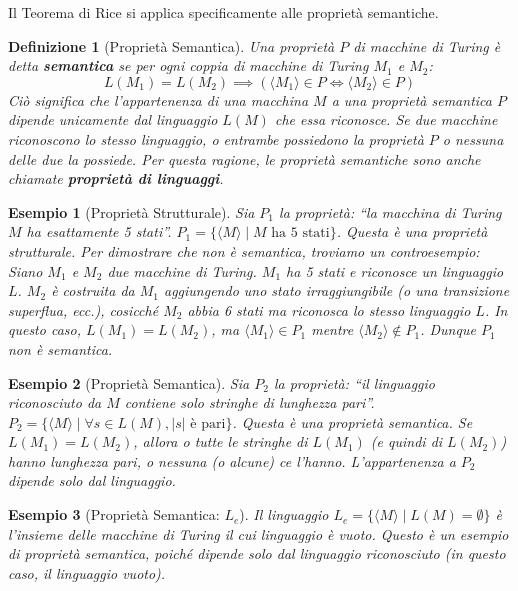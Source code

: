 \documentclass[a4paper]{article}
\newtheorem{definition}{Definizione}
\newtheorem{example}{Esempio}
\begin{document}
Il Teorema di Rice si applica specificamente alle proprietà semantiche.

\begin{definition}[Proprietà Semantica]
Una proprietà $P$ di macchine di Turing è detta \textbf{semantica} se per ogni coppia di macchine di Turing $M_1$ e $M_2$:
\[ L(M_1) = L(M_2) \implies (\langle M_1 \rangle \in P \iff \langle M_2 \rangle \in P) \]
Ciò significa che l'appartenenza di una macchina $M$ a una proprietà semantica $P$ dipende unicamente dal linguaggio $L(M)$ che essa riconosce. Se due macchine riconoscono lo stesso linguaggio, o entrambe possiedono la proprietà $P$ o nessuna delle due la possiede. Per questa ragione, le proprietà semantiche sono anche chiamate \textbf{proprietà di linguaggi}.
\end{definition}

\begin{example}[Proprietà Strutturale]
Sia $P_1$ la proprietà: ``la macchina di Turing $M$ ha esattamente 5 stati''.
$P_1 = \{ \langle M \rangle \mid M \text{ ha 5 stati} \}$.
Questa è una proprietà strutturale. Per dimostrare che non è semantica, troviamo un controesempio:
Siano $M_1$ e $M_2$ due macchine di Turing. $M_1$ ha 5 stati e riconosce un linguaggio $L$. $M_2$ è costruita da $M_1$ aggiungendo uno stato irraggiungibile (o una transizione superflua, ecc.), cosicché $M_2$ abbia 6 stati ma riconosca lo stesso linguaggio $L$. In questo caso, $L(M_1) = L(M_2)$, ma $\langle M_1 \rangle \in P_1$ mentre $\langle M_2 \rangle \notin P_1$. Dunque $P_1$ non è semantica.
\end{example}

\begin{example}[Proprietà Semantica]
Sia $P_2$ la proprietà: ``il linguaggio riconosciuto da $M$ contiene solo stringhe di lunghezza pari''.
$P_2 = \{ \langle M \rangle \mid \forall s \in L(M), |s| \text{ è pari} \}$.
Questa è una proprietà semantica. Se $L(M_1) = L(M_2)$, allora o tutte le stringhe di $L(M_1)$ (e quindi di $L(M_2)$) hanno lunghezza pari, o nessuna (o alcune) ce l'hanno. L'appartenenza a $P_2$ dipende solo dal linguaggio.
\end{example}

\begin{example}[Proprietà Semantica: $L_e$]
Il linguaggio $L_e = \{\langle M \rangle \mid L(M) = \emptyset\}$ è l'insieme delle macchine di Turing il cui linguaggio è vuoto. Questo è un esempio di proprietà semantica, poiché dipende solo dal linguaggio riconosciuto (in questo caso, il linguaggio vuoto).
\end{example}
\end{document}

